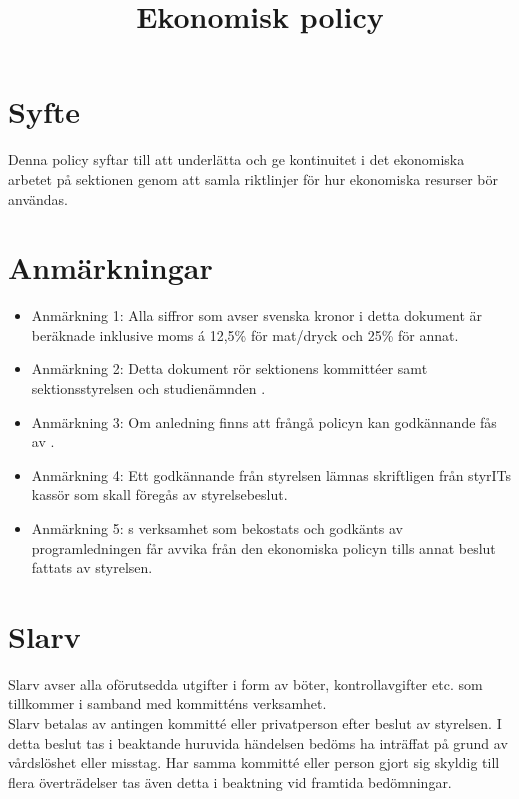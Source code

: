 \documentclass[11pt, includeaddress]{classes/cthit}
\begin{document}
\title{Ekonomisk policy}
\maketitle

\thispagestyle{empty}

\newpage

\makeheadfoot%

\setcounter{tocdepth}{2}
\setcounter{page}{1}
\tableofcontents

\newpage

\section{Syfte}
Denna policy syftar till att underlätta och ge kontinuitet i det ekonomiska arbetet på sektionen genom att samla riktlinjer för hur ekonomiska resurser bör användas.

\section{Anmärkningar}
\begin{itemize}
	\item Anmärkning 1: Alla siffror som avser svenska kronor i detta dokument är beräknade inklusive moms á 12,5\% för mat/dryck och 25\% för annat.
	\item Anmärkning 2: Detta dokument rör sektionens kommittéer samt sektionsstyrelsen \STYRIT{} och studienämnden \SNIT{}.
	\item Anmärkning 3: Om anledning finns att frångå policyn kan godkännande fås av \STYRIT{}.
	\item Anmärkning 4: Ett godkännande från styrelsen lämnas skriftligen från styrITs kassör som skall föregås av styrelsebeslut.
	\item Anmärkning 5: \SNIT{}s verksamhet som bekostats och godkänts av programledningen får avvika från den ekonomiska policyn tills annat beslut fattats av styrelsen.
\end{itemize}

\section{Slarv}
Slarv avser alla oförutsedda utgifter i form av böter, kontrollavgifter etc. som tillkommer i samband med kommitténs verksamhet. \\
Slarv betalas av antingen kommitté eller privatperson efter beslut av styrelsen. I detta beslut tas i beaktande huruvida händelsen bedöms ha inträffat på grund av vårdslöshet eller misstag. Har samma kommitté eller person gjort sig skyldig till flera överträdelser tas även detta i beaktning vid framtida bedömningar.
\end{document}
